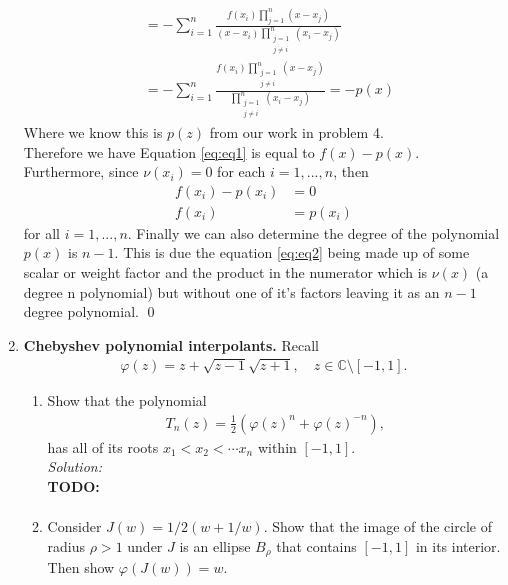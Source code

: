 \documentclass[10pt]{amsart}
\theoremstyle{nonumberplain}
\begin{document}
\begin{enumerate}[label={\bf {\arabic*}:}]
\begin{align}
	&= - \sum_{i=1}^n \frac{f(x_i)\prod_{j=1}^n (x - x_j)}{(x - x_i)\prod_{\substack{j=1 \\ j \neq i}}^n (x_i - x_j)} \nonumber \\
	&= - \sum_{i=1}^n \frac{f(x_i)\prod_{\substack{j=1 \\ j \neq i}}^n (x - x_j)}{\prod_{\substack{j=1 \\ j \neq i}}^n (x_i - x_j)}
\label{eq:eq2}
	= - p(x)
\end{align}
Where we know this is $p(z)$ from our work in problem 4. \\
Therefore we have Equation \eqref{eq:eq1} is equal to $f(x) - p(x)$.
Furthermore, since $\nu(x_i) = 0$ for each $i = 1, ..., n$, then
\begin{align*}
f(x_i) - p(x_i) &= 0 \\
f(x_i) &= p(x_i)
\end{align*}
for all $i = 1, ..., n$.
Finally we can also determine the degree of the polynomial $p(x)$ is $n - 1$.
This is due the equation \eqref{eq:eq2} being made up of some scalar or weight factor and the product in the numerator which is $\nu(x)$ (a degree n polynomial) but without one of it's factors leaving it as an $n - 1$ degree polynomial.
\qed \\

\newpage


\item  \textbf{Chebyshev polynomial interpolants.}  Recall 
\begin{align*}
\varphi(z) = z + \sqrt{z - 1} \sqrt{z +1}, \quad z \in \mathbb C \setminus [-1,1].
\end{align*}

\begin{enumerate}
\item Show that the polynomial
\begin{align*}
T_n(z) = \frac 1 2 \left( \varphi(z)^n + \varphi(z)^{-n} \right),
\end{align*}
has all of its roots $x_1 < x_2 < \cdots x_n$ within $[-1,1]$. \\

\noindent
\textit{Solution:} \\
\textbf{TODO:}
\begin{align*}
\end{align*}

\item Consider $J(w) =  1/2 (w + 1/w)$. 
Show that the image of the circle of radius $\rho > 1$ under $J$ is an ellipse $B_\rho$ that contains $[-1,1]$ in its interior.
Then show $\varphi(J(w)) = w$. \\


\end{enumerate}
\end{enumerate}
\end{document}

